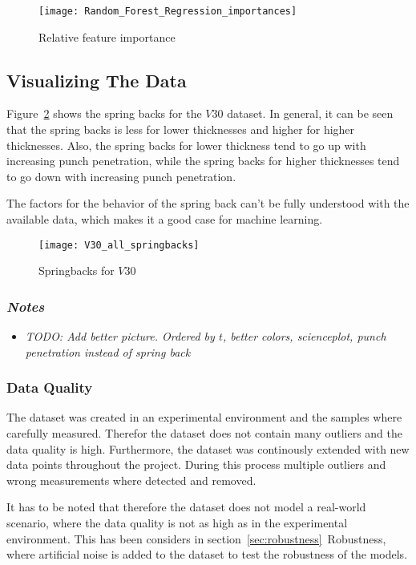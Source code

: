 \begin{figure}[H]
    \centering
    \texttt{[image: Random\_Forest\_Regression\_importances]}
    \caption{Relative feature importance}
    \label{fig:rf_feature_importance}
\end{figure}


\subsection{Visualizing The Data}
Figure~\ref{fig:v30_springbacks} shows the spring backs for the $V30$ dataset.
In general, it can be seen that the spring backs is less for lower thicknesses and higher for higher thicknesses.
Also, the spring backs for lower thickness tend to go up with increasing punch penetration, while the spring backs for higher thicknesses tend to go down with increasing punch penetration.

The factors for the behavior of the spring back can't be fully understood with the available data, which makes it a good case for machine learning.

\begin{figure}[H]
    \centering
    \texttt{[image: V30\_all\_springbacks]}
    \caption{Springbacks for $V30$}
    \label{fig:v30_springbacks}
\end{figure}

\subsubsection*{\textit{Notes}}
\begin{itemize}
    \item \textit{TODO: Add better picture. Ordered by $t$, better colors, scienceplot, punch penetration instead of spring back}
\end{itemize}


\subsubsection{Data Quality}
The dataset was created in an experimental environment and the samples where carefully measured.
Therefor the dataset does not contain many outliers and the data quality is high.
Furthermore, the dataset was continously extended with new data points throughout the project. During this process multiple outliers and wrong measurements where detected and removed.

It has to be noted that therefore the dataset does not model a real-world scenario, where the data quality is not as high as in the experimental environment.
This has been considers in section~\ref{sec:robustness}~Robustness, where artificial noise is added to the dataset to test the robustness of the models.



